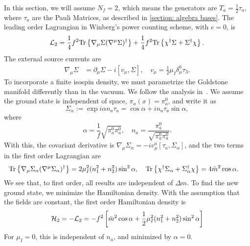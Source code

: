 In this section, we will assume $N_f = 2$, which means the generators are $T_a = \frac{1}{2} \tau_a$, where $\tau_a$ are the Pauli Matrices, as described in \autoref{section: algebra bases}.
The leading order Lagrangian in Winberg's power counting scheme, with $e = 0$, is
%
\begin{equation}
    \label{leading order two-flavor chpt lagrangian}
    \mathcal{L}_2 = 
    \frac{1}{4} f^2 \text{Tr} \left\{ \nabla_\mu \Sigma (\nabla^\mu \Sigma)^\dagger \right\}
    + \frac{1}{4} f^2 \text{Tr} \left\{ \chi^\dagger \Sigma + \Sigma^\dagger \chi \right\}.
\end{equation}
%
The external source currents are
\begin{align}
    \nabla_\mu \Sigma &= \partial_\mu \Sigma - i [v_\mu, \Sigma],
    \quad v_\mu = \frac{1}{2} \mu_I \delta_\mu^0 \tau_3.
\end{align}
To incorporate a finite isospin density, we must parametrize the Goldstone manifold differently than in the vacuum.
We follow the analysis in~\autocite{adhikariTwoflavorChiralPerturbation2019}.
We assume the ground state is independent of space, $\pi_a(x) = \pi_a^0$, and write it as
\begin{equation}
    \Sigma_\alpha 
    :=
    \exp{i \alpha n_a \tau_a}
    = 
    \cos \alpha + i n_a \tau_a \sin \alpha,
\end{equation}
%
where
\begin{equation}
    \alpha = \frac{1}{f} \sqrt{\pi^0_a \pi^0_a}, \quad
    n_a = \frac{\pi^0_a}{\sqrt{\pi^0_a \pi^0_a}}.
\end{equation}
%
With this, the covariant derivative is $\nabla_\mu \Sigma_\alpha = - iv^a_\mu [\tau_a, \Sigma_\alpha]$, and the two terms in the first order Lagrangian are
\begin{align}
    \text{Tr} \left\{ \nabla_\mu \Sigma_\alpha  (\nabla^\mu \Sigma_\alpha)^\dagger \right\}
    & = 2 \mu_I^2 (n_1^2 + n_2^2) \sin^2 \alpha, \quad
    \text{Tr} \left\{ \chi^\dagger \Sigma_\alpha + \Sigma_\alpha^\dagger \chi \right\}
    = 4 \bar m^2 \cos \alpha.
\end{align}
%
We see that, to first order, all results are independent of $\Delta m$.
To find the new ground state, we minimize the Hamiltonian density.
With the assumption that the fields are constant, the first order Hamiltonian density is
\begin{equation}
    \mathcal{H}_2 = - \mathcal{L}_2 = 
    - f^2 
    \left[
        \bar m^2 \cos\alpha 
        + \frac{1}{2} \mu_I^2 (n_1^2 + n_2^2 ) \sin^2 \alpha
    \right]
\end{equation}
%
For $\mu_I = 0$, this is independent of $n_a$, and minimized by $\alpha = 0$.
